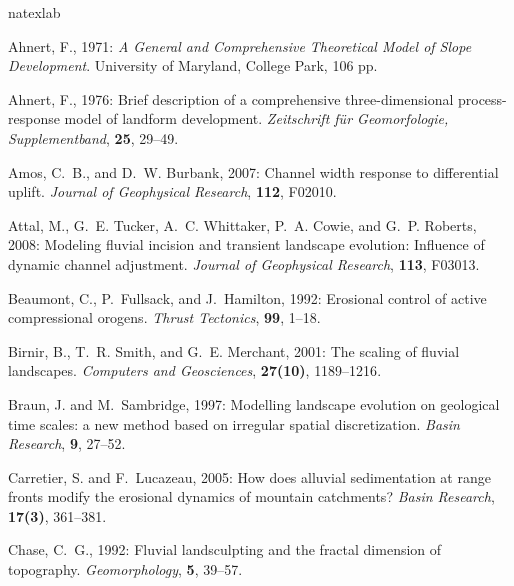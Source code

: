 \documentclass[12pt,reqno]{amsart}
\begin{document}
\begin{thebibliography}{41}
\expandafter\ifx\csname natexlab\endcsname\relax\def\natexlab#1{#1}\fi

Ahnert, F., 1971: {\em A General and Comprehensive Theoretical Model of
Slope Development}. University of Maryland, College Park, 106 pp.

Ahnert, F., 1976: Brief description of a comprehensive three-dimensional
  process-response model of landform development. {\em Zeitschrift f\"{u}r
  Geomorfologie, Supplementband\/}, {\bf 25}, 29--49.

Amos, C.~B., and D.~W. Burbank, 2007: Channel width response to
  differential uplift. {\em Journal of Geophysical Research\/}, {\bf
  112}, F02010. 

Attal, M., G.~E. Tucker, A.~C. Whittaker, P.~A. Cowie, and G.~P. Roberts, 2008:
  Modeling fluvial incision and transient landscape evolution: Influence of
  dynamic channel adjustment. {\em Journal of Geophysical Research\/}, {\bf
  113}, F03013.

Beaumont, C., P.~Fullsack, and J.~Hamilton, 1992: {Erosional control of active
  compressional orogens}. {\em Thrust Tectonics\/}, {\bf 99}, 1--18.

Birnir, B., T.~R. Smith, and G.~E. Merchant, {2001}: {The scaling of fluvial 
  landscapes}. {\em Computers and Geosciences\/}, {\bf 27(10)}, {1189--1216}.

Braun, J. and M.~Sambridge, 1997: Modelling landscape evolution on geological
  time scales: a new method based on irregular spatial discretization. {\em
  Basin Research\/}, {\bf 9}, 27--52.

Carretier, S. and F.~Lucazeau, 2005: {How does alluvial sedimentation at range
  fronts modify the erosional dynamics of mountain catchments?} {\em Basin
  Research\/}, {\bf 17(3)}, 361--381.

Chase, C.~G., 1992: Fluvial landsculpting and the fractal dimension of
  topography. {\em Geomorphology\/}, {\bf 5}, 39--57.


\end{thebibliography}
\end{document}
